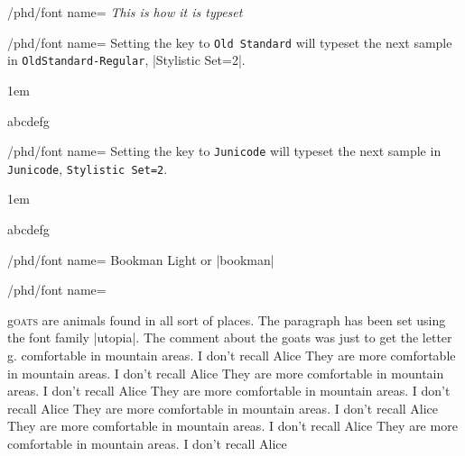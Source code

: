 \begin{key}{/phd/font name=}
\bgroup \itshape This is how it is typeset\egroup
\end{key}


\begin{key}{/phd/font name=}
Setting the key to \texttt{Old Standard} will typeset the next sample in \texttt{OldStandard-Regular}, |Stylistic Set=2|. 

\bgroup
\parindent1em\itshape
^^A

\aliceii

abcdefg
\egroup
\end{key}

\begin{key}{/phd/font name=}
Setting the key to \texttt{Junicode} will typeset the next sample in \texttt{Junicode}, \texttt{Stylistic Set=2}. 

\bgroup
\parindent1em\itshape
{}

\aliceii

abcdefg
\egroup
\end{key}




\begin{key}{/phd/font name=}
Bookman Light or |bookman|
\end{key}

\bgroup
{}
\small
\aliceiii
\egroup


\begin{key}{/phd/font name=}

\end{key}

\bgroup
{}

\renewcommand{\LettrineFontHook}{\fontfamily{put}\fontseries{bx}}%
\par\leavevmode

\lettrine[lines=5, lhang=0.1,lraise=0.28,findent=1pt]{g}{oats} are animals found in all sort of places. The paragraph has been set using the font family |utopia|. The comment about the goats was just to get the letter g.
comfortable in mountain areas. I don't recall Alice  They are more
comfortable in mountain areas. I don't recall Alice  They are more
comfortable in mountain areas. I don't recall Alice  They are more
comfortable in mountain areas. I don't recall Alice  They are more
comfortable in mountain areas. I don't recall Alice  They are more
comfortable in mountain areas. I don't recall Alice  They are more
comfortable in mountain areas. I don't recall Alice 


